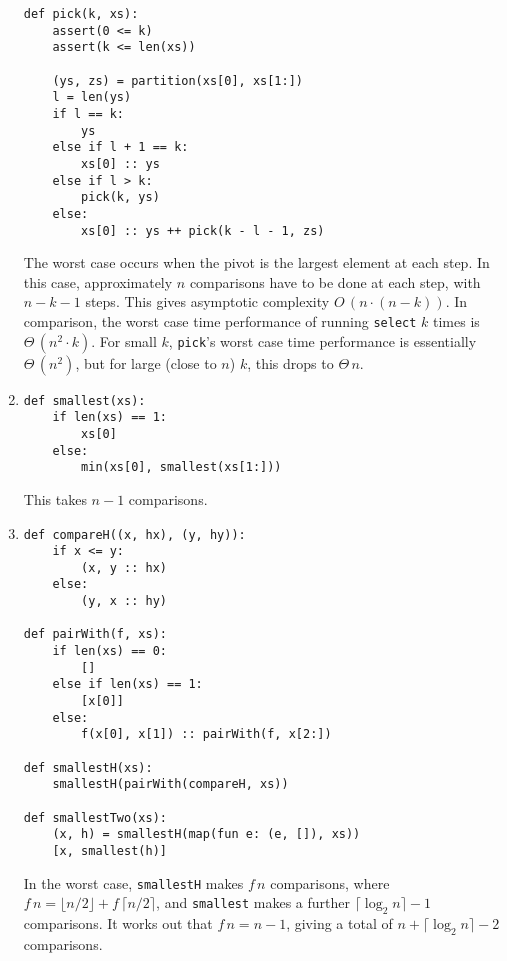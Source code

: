 \documentclass[11pt]{article}
\begin{document}
\begin{enumerate}
  \begin{minipage}[t]{\linewidth}
    \begin{lstlisting}
def pick(k, xs):
    assert(0 <= k)
    assert(k <= len(xs))

    (ys, zs) = partition(xs[0], xs[1:])
    l = len(ys)
    if l == k:
        ys
    else if l + 1 == k:
        xs[0] :: ys
    else if l > k:
        pick(k, ys)
    else:
        xs[0] :: ys ++ pick(k - l - 1, zs)
    \end{lstlisting}
  \end{minipage}
  The worst case occurs when the pivot is the largest element at each step. In this case, approximately \(n\) comparisons have to be done at each step, with \(n-k-1\) steps. This gives asymptotic complexity \(O\,(n\cdot(n-k))\). In comparison, the worst case time performance of running \texttt{select} \(k\) times is \(\Theta\,\left(n^2\cdot k\right)\). For small \(k\), \texttt{pick}'s worst case time performance is essentially \(\Theta\,\left(n^2\right)\), but for large (close to \(n\)) \(k\), this drops to \(\Theta\,n\).
\item
  \begin{minipage}[t]{\linewidth}
    \begin{lstlisting}
def smallest(xs):
    if len(xs) == 1:
        xs[0]
    else:
        min(xs[0], smallest(xs[1:]))
    \end{lstlisting}
  \end{minipage}
This takes \(n-1\) comparisons.
\item
  \begin{minipage}[t]{\linewidth}
    \begin{lstlisting}
def compareH((x, hx), (y, hy)):
    if x <= y:
        (x, y :: hx)
    else:
        (y, x :: hy)

def pairWith(f, xs):
    if len(xs) == 0:
        []
    else if len(xs) == 1:
        [x[0]]
    else:
        f(x[0], x[1]) :: pairWith(f, x[2:])

def smallestH(xs):
    smallestH(pairWith(compareH, xs))

def smallestTwo(xs):
    (x, h) = smallestH(map(fun e: (e, []), xs))
    [x, smallest(h)]
    \end{lstlisting}
  \end{minipage}
  In the worst case, \texttt{smallestH} makes \(f\,n\) comparisons, where \(f\,n=\lfloor n/2 \rfloor+f\,\lceil n/2 \rceil\), and \texttt{smallest} makes a further \(\lceil \log_2 n \rceil-1\) comparisons. It works out that \(f\,n=n-1\), giving a total of \(n+\lceil \log_2 n \rceil-2\) comparisons.
\end{enumerate}
\end{document}
